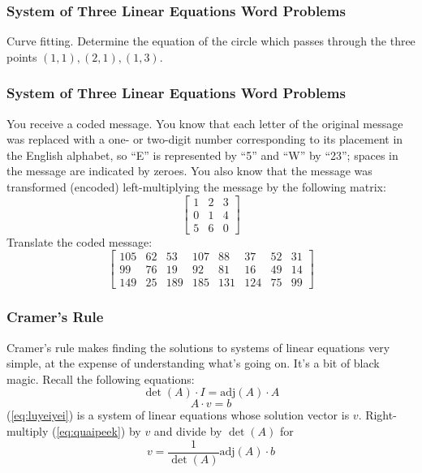 \documentclass[xcolor=dvipsnames]{beamer}
\begin{document}
\begin{frame}
  \frametitle{System of Three Linear Equations Word Problems}
  {\ubung} Curve fitting. Determine the equation of the circle which
  passes through the three points $(1,1),(2,1),(1,3)$. 
\end{frame}

\begin{frame}
  \frametitle{System of Three Linear Equations Word Problems}
  {\ubung} You receive a coded message. You know that each letter of
  the original message was replaced with a one- or two-digit number
  corresponding to its placement in the English alphabet, so ``E'' is
  represented by ``5'' and ``W'' by ``23''; spaces in the message are
  indicated by zeroes. You also know that the message was transformed
  (encoded) left-multiplying the message by the following matrix:
\begin{equation}
  \label{eq:iephaeke}
  \left[
    \begin{array}{ccc}
    1 & 2  & 3  \\
    0 & 1  & 4  \\
    5 & 6  & 0 
  \end{array}\right]
\end{equation}
Translate the coded message:
\begin{equation}
  \label{eq:euseeyee}
  \left[
    \begin{array}{cccccccc}
    105   & 62 & 53  & 107 & 88  & 37  & 52 & 31 \\
    99    & 76 & 19  & 92  & 81  & 16  & 49 & 14 \\
    149   & 25 & 189 & 185 & 131 & 124 & 75 & 99
  \end{array}\right]
\end{equation}
\end{frame}

\begin{frame}
  \frametitle{Cramer's Rule}
  Cramer's rule makes finding the solutions to systems of linear
  equations very simple, at the expense of understanding what's going
  on. It's a bit of black magic. Recall the following equations:
  \begin{equation}
    \label{eq:quaipeek}
  \det(A)\cdot{}I=\mbox{adj}(A)\cdot{}A
  \end{equation}
  \begin{equation}
    \label{eq:luyeiyei}
    A\cdot{}v=b
  \end{equation}
(\ref{eq:luyeiyei}) is a system of linear equations whose solution
vector is $v$. Right-multiply (\ref{eq:quaipeek}) by $v$ and divide by
$\det(A)$ for
\begin{equation}
  \label{eq:ohghoyae}
  v=\frac{1}{\det(A)}\mbox{adj}(A)\cdot{}b
\end{equation}
\end{frame}
\end{document}
